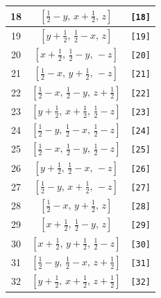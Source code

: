 \documentclass[fleqn,8pt]{jsarticle}
\begin{document}
\begin{longtable}{ccc}
18 & $\left[ \frac{1}{2} - y,\, x + \frac{1}{2},\, z \right]$ & {\tt [18]} \\ \hline
19 & $\left[ y + \frac{1}{2},\, \frac{1}{2} - x,\, z \right]$ & {\tt [19]} \\ \hline
20 & $\left[ x + \frac{1}{2},\, \frac{1}{2} - y,\, - z \right]$ & {\tt [20]} \\ \hline
21 & $\left[ \frac{1}{2} - x,\, y + \frac{1}{2},\, - z \right]$ & {\tt [21]} \\ \hline
22 & $\left[ \frac{1}{2} - x,\, \frac{1}{2} - y,\, z + \frac{1}{2} \right]$ & {\tt [22]} \\ \hline
23 & $\left[ y + \frac{1}{2},\, x + \frac{1}{2},\, \frac{1}{2} - z \right]$ & {\tt [23]} \\ \hline
24 & $\left[ \frac{1}{2} - y,\, \frac{1}{2} - x,\, \frac{1}{2} - z \right]$ & {\tt [24]} \\ \hline
25 & $\left[ \frac{1}{2} - x,\, \frac{1}{2} - y,\, \frac{1}{2} - z \right]$ & {\tt [25]} \\ \hline
26 & $\left[ y + \frac{1}{2},\, \frac{1}{2} - x,\, - z \right]$ & {\tt [26]} \\ \hline
27 & $\left[ \frac{1}{2} - y,\, x + \frac{1}{2},\, - z \right]$ & {\tt [27]} \\ \hline
28 & $\left[ \frac{1}{2} - x,\, y + \frac{1}{2},\, z \right]$ & {\tt [28]} \\ \hline
29 & $\left[ x + \frac{1}{2},\, \frac{1}{2} - y,\, z \right]$ & {\tt [29]} \\ \hline
30 & $\left[ x + \frac{1}{2},\, y + \frac{1}{2},\, \frac{1}{2} - z \right]$ & {\tt [30]} \\ \hline
31 & $\left[ \frac{1}{2} - y,\, \frac{1}{2} - x,\, z + \frac{1}{2} \right]$ & {\tt [31]} \\ \hline
32 & $\left[ y + \frac{1}{2},\, x + \frac{1}{2},\, z + \frac{1}{2} \right]$ & {\tt [32]} \\
\end{longtable}
\end{document}
